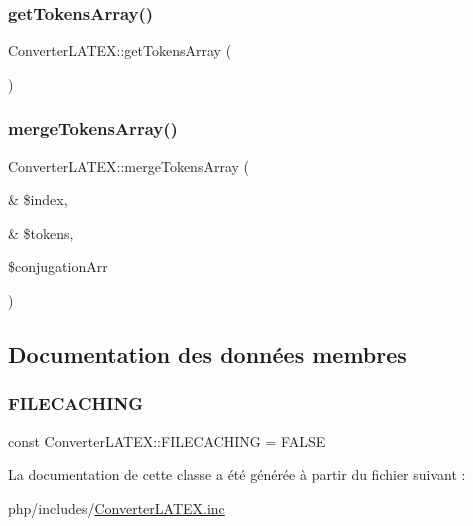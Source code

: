 \subsubsection{\texorpdfstring{get\+Tokens\+Array()}{getTokensArray()}}
{\footnotesize\ttfamily Converter\+L\+A\+T\+E\+X\+::get\+Tokens\+Array (\begin{DoxyParamCaption}{ }\end{DoxyParamCaption})\hspace{0.3cm}{\ttfamily [protected]}}

\hypertarget{class_converter_l_a_t_e_x_a5c2a6e5f6478af9a846f3b607c8d9105}{}\label{class_converter_l_a_t_e_x_a5c2a6e5f6478af9a846f3b607c8d9105} 
\subsubsection{\texorpdfstring{merge\+Tokens\+Array()}{mergeTokensArray()}}
{\footnotesize\ttfamily Converter\+L\+A\+T\+E\+X\+::merge\+Tokens\+Array (\begin{DoxyParamCaption}\item[{\&}]{\$index,  }\item[{\&}]{\$tokens,  }\item[{}]{\$conjugation\+Arr }\end{DoxyParamCaption})\hspace{0.3cm}{\ttfamily [protected]}}



\subsection{Documentation des données membres}
\hypertarget{class_converter_l_a_t_e_x_adaea9c0bff492f67f17ebe245ee889b1}{}\label{class_converter_l_a_t_e_x_adaea9c0bff492f67f17ebe245ee889b1} 
\subsubsection{\texorpdfstring{F\+I\+L\+E\+C\+A\+C\+H\+I\+NG}{FILECACHING}}
{\footnotesize\ttfamily const Converter\+L\+A\+T\+E\+X\+::\+F\+I\+L\+E\+C\+A\+C\+H\+I\+NG = F\+A\+L\+SE}



La documentation de cette classe a été générée à partir du fichier suivant \+:\begin{DoxyCompactItemize}
\item 
php/includes/\hyperlink{_converter_l_a_t_e_x_8inc}{Converter\+L\+A\+T\+E\+X.\+inc}\end{DoxyCompactItemize}
